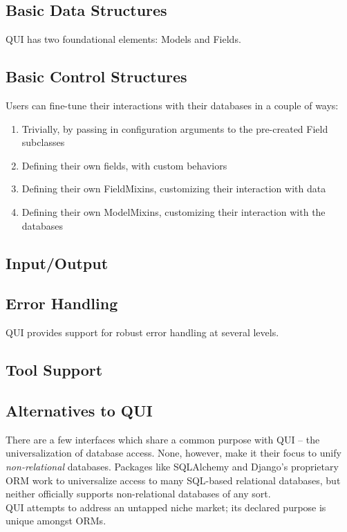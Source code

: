 \documentclass{article} %
\begin{document}
\subsection{Basic Data Structures}
QUI has two foundational elements: Models and Fields. 
\subsection{Basic Control Structures}
Users can fine-tune their interactions with their databases in a couple of ways:
\begin{enumerate}
\item Trivially, by passing in configuration arguments to the pre-created Field subclasses
\item Defining their own fields, with custom behaviors
\item Defining their own FieldMixins, customizing their interaction with data
\item Defining their own ModelMixins, customizing their interaction with the databases
\end{enumerate}

\subsection{Input/Output}

\subsection{Error Handling}
QUI provides support for robust error handling at several levels.

\subsection{Tool Support}


\subsection{Alternatives to QUI}
There are a few interfaces which share a common purpose with QUI -- the universalization of database access. None, however,
make it their focus to unify \emph{non-relational} databases. Packages like SQLAlchemy and Django's proprietary ORM work to
universalize access to many SQL-based relational databases, but neither officially supports non-relational databases of any sort.\\

QUI attempts to address an untapped niche market; its declared purpose is unique amongst ORMs.
\end{document}

